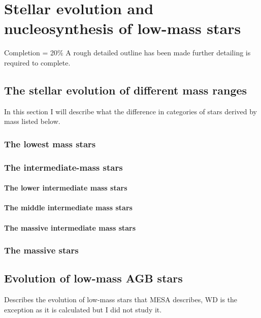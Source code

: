\chapter{Stellar evolution and nucleosynthesis of low-mass stars}

Completion = 20\% 
A rough detailed outline has been made further detailing is required to complete.

\section{The stellar evolution of different mass ranges}

In this section I will describe what the difference in categories of stars derived by mass listed below.

\subsection{The lowest mass stars}

\subsection{The intermediate-mass stars}

\subsubsection{The lower intermediate mass stars}

\subsubsection{The middle intermediate mass stars}

\subsubsection{The massive intermediate mass stars}

\subsection{The massive stars}

\section{Evolution of low-mass AGB stars}

Describes the evolution of low-mass stars that MESA describes, WD is the exception as it is calculated but I did not study it.

